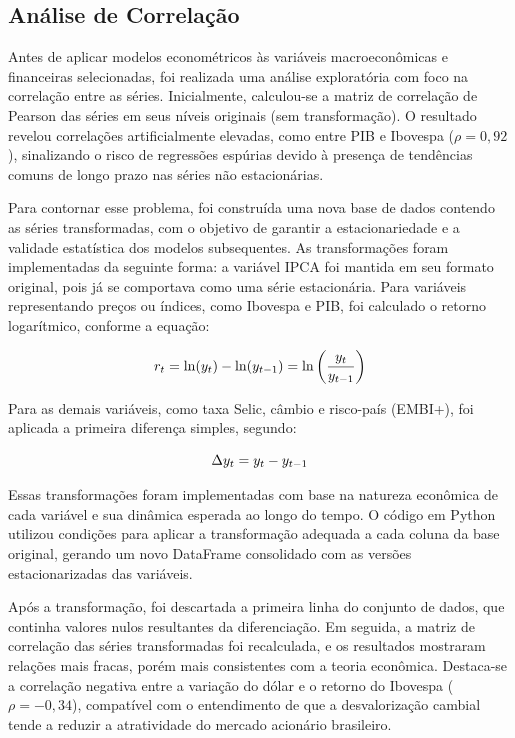 \documentclass[	12pt, Times, openright, oneside, a4paper, english, brazil]{abntex2}
\begin{document}
\subsection{Análise de Correlação}

Antes de aplicar modelos econométricos às variáveis macroeconômicas e financeiras selecionadas, foi realizada uma análise exploratória com foco na correlação entre as séries. Inicialmente, calculou-se a matriz de correlação de Pearson das séries em seus níveis originais (sem transformação). O resultado revelou correlações artificialmente elevadas, como entre PIB e Ibovespa ($\rho = 0{,}92$), sinalizando o risco de regressões espúrias devido à presença de tendências comuns de longo prazo nas séries não estacionárias.

Para contornar esse problema, foi construída uma nova base de dados contendo as séries transformadas, com o objetivo de garantir a estacionariedade e a validade estatística dos modelos subsequentes. As transformações foram implementadas da seguinte forma: a variável IPCA foi mantida em seu formato original, pois já se comportava como uma série estacionária. Para variáveis representando preços ou índices, como Ibovespa e PIB, foi calculado o retorno logarítmico, conforme a equação:

\begin{equation}\hfill
r_t = \ln(y_t) - \ln(y_{t-1}) = \ln\left(\frac{y_t}{y_{t-1}}\right)
\label{eq:log_return}
\end{equation}

Para as demais variáveis, como taxa Selic, câmbio e risco-país (EMBI+), foi aplicada a primeira diferença simples, segundo:

\begin{equation}\hfill
\Delta y_t = y_t - y_{t-1}
\label{eq:first_difference}
\end{equation}

Essas transformações foram implementadas com base na natureza econômica de cada variável e sua dinâmica esperada ao longo do tempo. O código em Python utilizou condições para aplicar a transformação adequada a cada coluna da base original, gerando um novo DataFrame consolidado com as versões estacionarizadas das variáveis.

Após a transformação, foi descartada a primeira linha do conjunto de dados, que continha valores nulos resultantes da diferenciação. Em seguida, a matriz de correlação das séries transformadas foi recalculada, e os resultados mostraram relações mais fracas, porém mais consistentes com a teoria econômica. Destaca-se a correlação negativa entre a variação do dólar e o retorno do Ibovespa ($\rho = -0{,}34$), compatível com o entendimento de que a desvalorização cambial tende a reduzir a atratividade do mercado acionário brasileiro.
\end{document}
